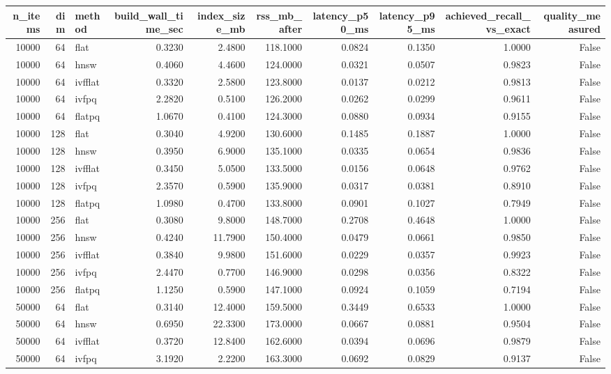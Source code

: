 \begin{tabular}{rrlrrrrrrr}
\toprule
n_items & dim & method & build_wall_time_sec & index_size_mb & rss_mb_after & latency_p50_ms & latency_p95_ms & achieved_recall_vs_exact & quality_measured \\
\midrule
10000 & 64 & flat & 0.3230 & 2.4800 & 118.1000 & 0.0824 & 0.1350 & 1.0000 & False \\
10000 & 64 & hnsw & 0.4060 & 4.4600 & 124.0000 & 0.0321 & 0.0507 & 0.9823 & False \\
10000 & 64 & ivfflat & 0.3320 & 2.5800 & 123.8000 & 0.0137 & 0.0212 & 0.9813 & False \\
10000 & 64 & ivfpq & 2.2820 & 0.5100 & 126.2000 & 0.0262 & 0.0299 & 0.9611 & False \\
10000 & 64 & flatpq & 1.0670 & 0.4100 & 124.3000 & 0.0880 & 0.0934 & 0.9155 & False \\
10000 & 128 & flat & 0.3040 & 4.9200 & 130.6000 & 0.1485 & 0.1887 & 1.0000 & False \\
10000 & 128 & hnsw & 0.3950 & 6.9000 & 135.1000 & 0.0335 & 0.0654 & 0.9836 & False \\
10000 & 128 & ivfflat & 0.3450 & 5.0500 & 133.5000 & 0.0156 & 0.0648 & 0.9762 & False \\
10000 & 128 & ivfpq & 2.3570 & 0.5900 & 135.9000 & 0.0317 & 0.0381 & 0.8910 & False \\
10000 & 128 & flatpq & 1.0980 & 0.4700 & 133.8000 & 0.0901 & 0.1027 & 0.7949 & False \\
10000 & 256 & flat & 0.3080 & 9.8000 & 148.7000 & 0.2708 & 0.4648 & 1.0000 & False \\
10000 & 256 & hnsw & 0.4240 & 11.7900 & 150.4000 & 0.0479 & 0.0661 & 0.9850 & False \\
10000 & 256 & ivfflat & 0.3840 & 9.9800 & 151.6000 & 0.0229 & 0.0357 & 0.9923 & False \\
10000 & 256 & ivfpq & 2.4470 & 0.7700 & 146.9000 & 0.0298 & 0.0356 & 0.8322 & False \\
10000 & 256 & flatpq & 1.1250 & 0.5900 & 147.1000 & 0.0924 & 0.1059 & 0.7194 & False \\
50000 & 64 & flat & 0.3140 & 12.4000 & 159.5000 & 0.3449 & 0.6533 & 1.0000 & False \\
50000 & 64 & hnsw & 0.6950 & 22.3300 & 173.0000 & 0.0667 & 0.0881 & 0.9504 & False \\
50000 & 64 & ivfflat & 0.3720 & 12.8400 & 162.6000 & 0.0394 & 0.0696 & 0.9879 & False \\
50000 & 64 & ivfpq & 3.1920 & 2.2200 & 163.3000 & 0.0692 & 0.0829 & 0.9137 & False \\

\end{tabular}
